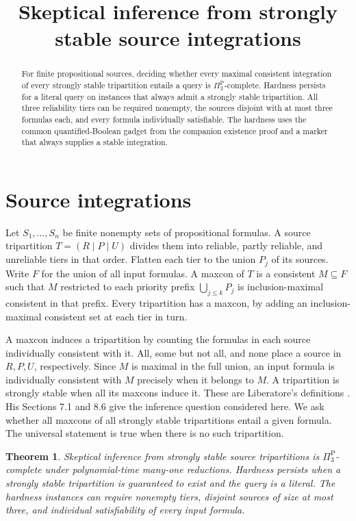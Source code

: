 \documentclass[11pt,a4paper]{amsart}
\title{Skeptical inference from strongly stable source integrations}
\date{}
\newtheorem{theorem}{Theorem}
\begin{document}
\begin{abstract}
For finite propositional sources, deciding whether every maximal
consistent integration of every strongly stable tripartition entails
a query is \(\Pi_3^{\mathrm P}\)-complete. Hardness persists for a
literal query on instances that always admit a strongly stable
tripartition. All three reliability tiers can be required nonempty,
the sources disjoint with at most three formulas each, and every
formula individually satisfiable. The hardness uses the common
quantified-Boolean gadget from the companion existence proof and
a marker that always supplies a stable integration.
\end{abstract}
\maketitle

\section{Source integrations}

Let \(S_1,\ldots,S_n\) be finite nonempty sets of propositional
formulas. A source tripartition \(T=(R\mid P\mid U)\) divides them
into reliable, partly reliable, and unreliable tiers in that order.
Flatten each tier to the union \(P_j\) of its sources. Write \(F\)
for the union of all input formulas. A maxcon of \(T\) is a
consistent \(M\subseteq F\) such that \(M\) restricted to each
priority prefix \(\bigcup_{j\le k}P_j\) is inclusion-maximal
consistent in that prefix. Every tripartition has a maxcon,
by adding an inclusion-maximal consistent set at each tier in turn.

A maxcon induces a tripartition by counting the formulas in each
source individually consistent with it. All, some but not all, and
none place a source in \(R,P,U\), respectively. Since \(M\) is
maximal in the full union, an input formula is individually
consistent with \(M\) precisely when it belongs to \(M\). A
tripartition is strongly stable when all its maxcons induce it.
These are Liberatore's definitions \cite[Defs.~1--4 and 11]{lib}.
His Sections 7.1 and 8.6 give the inference question considered here.
We ask whether all maxcons of all strongly stable tripartitions
entail a given formula. The universal statement is true when
there is no such tripartition.

\begin{theorem}
Skeptical inference from strongly stable source tripartitions is
\(\Pi_3^{\mathrm P}\)-complete under polynomial-time many-one
reductions. Hardness persists when a strongly stable tripartition
is guaranteed to exist and the query is a literal. The hardness
instances can require nonempty tiers, disjoint sources of size at
most three, and individual satisfiability of every input formula.
\end{theorem}
\end{document}
